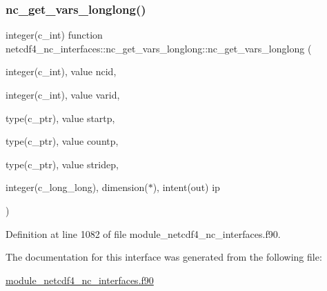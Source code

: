 \subsubsection{\texorpdfstring{nc\+\_\+get\+\_\+vars\+\_\+longlong()}{nc\_get\_vars\_longlong()}}
{\footnotesize\ttfamily integer(c\+\_\+int) function netcdf4\+\_\+nc\+\_\+interfaces\+::nc\+\_\+get\+\_\+vars\+\_\+longlong\+::nc\+\_\+get\+\_\+vars\+\_\+longlong (\begin{DoxyParamCaption}\item[{integer(c\+\_\+int), value}]{ncid,  }\item[{integer(c\+\_\+int), value}]{varid,  }\item[{type(c\+\_\+ptr), value}]{startp,  }\item[{type(c\+\_\+ptr), value}]{countp,  }\item[{type(c\+\_\+ptr), value}]{stridep,  }\item[{integer(c\+\_\+long\+\_\+long), dimension($\ast$), intent(out)}]{ip }\end{DoxyParamCaption})}



Definition at line 1082 of file module\+\_\+netcdf4\+\_\+nc\+\_\+interfaces.\+f90.



The documentation for this interface was generated from the following file\+:\begin{DoxyCompactItemize}
\item 
\hyperlink{module__netcdf4__nc__interfaces_8f90}{module\+\_\+netcdf4\+\_\+nc\+\_\+interfaces.\+f90}\end{DoxyCompactItemize}
